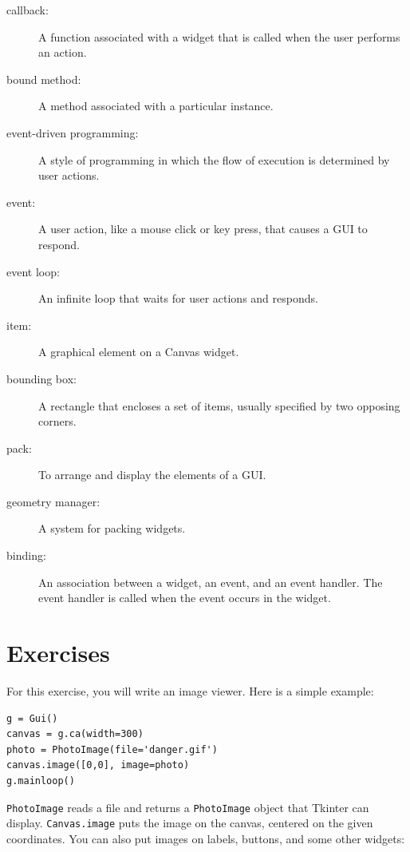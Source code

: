 \documentclass[10pt]{book}
\begin{document}
\begin{CJK}{UTF8}{gbsn}
\begin{description}
\item[callback:] A function associated with a widget that is
called when the user performs an action.

\item[bound method:] A method associated with a particular instance.

\item[event-driven programming:] A style of programming in which
the flow of execution is determined by user actions.

\item[event:] A user action, like a mouse click or key press, that
causes a GUI to respond.

\item[event loop:] An infinite loop that waits for user actions
and responds.

\item[item:] A graphical element on a Canvas widget.

\item[bounding box:] A rectangle that encloses a set of items,
usually specified by two opposing corners.

\item[pack:] To arrange and display the elements of a GUI.

\item[geometry manager:] A system for packing widgets.

\item[binding:] An association between a widget, an event, and
an event handler.  The event handler is called when the event
occurs in the widget.

\end{description}


\section{Exercises}

\begin{exercise}

For this exercise, you will write an image viewer.  Here is
a simple example:

\begin{verbatim}
g = Gui()
canvas = g.ca(width=300)
photo = PhotoImage(file='danger.gif')
canvas.image([0,0], image=photo)
g.mainloop()
\end{verbatim}
%
{\tt PhotoImage} reads a file and returns a {\tt PhotoImage} object
that Tkinter can display.  {\tt Canvas.image} puts the image on the
canvas, centered on the given coordinates.  You can also put images on
labels, buttons, and some other widgets:


\end{exercise}
\end{CJK}
\end{document}
